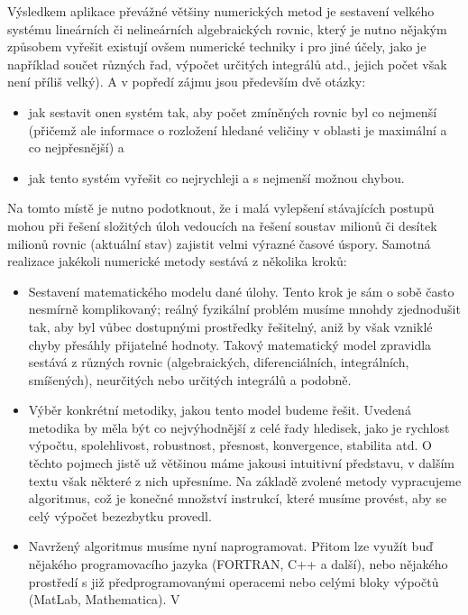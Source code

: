 {    Výsledkem aplikace převážné většiny numerických metod je sestavení velkého systému lineárních či
    nelineárních algebraických rovnic, který je nutno nějakým způsobem vyřešit existují ovšem
    numerické techniky i pro jiné účely, jako je například součet různých řad, výpočet určitých
    integrálů atd., jejich počet však není příliš velký). A v popředí zájmu jsou především dvě
    otázky:
    \begin{itemize}
      \item jak sestavit onen systém tak, aby počet zmíněných rovnic byl co nej\-men\-ší (přičemž 
            ale informace o rozložení hledané veličiny v oblasti je maximální a co nejpřesnější) a
      \item jak tento systém vyřešit co nejrychleji a s nejmenší možnou chybou.
    \end{itemize}
    Na tomto místě je nutno podotknout, že i malá vylepšení stávajících postupů mohou při řešení
    složitých úloh vedoucích na řešení soustav milionů či desítek milionů rovnic (aktuální stav)
    zajistit velmi výrazné časové úspory. Samotná realizace jakékoli numerické metody sestává z
    několika kroků:
    \begin{itemize}
      \item Sestavení matematického modelu dané úlohy. Tento krok je sám o sobě často nesmírně
            komplikovaný; reálný fyzikální problém musíme mnohdy zjednodušit tak, aby byl vůbec
            dostupnými prostředky řešitel\-ný, aniž by však vzniklé chyby přesáhly přijatelné 
            hodnoty. Takový matematický model zpravidla sestává z různých rovnic (algebraických,
            diferenciálních, integrálních, smíšených), neurčitých nebo určitých integrálů a podobně.
      \item Výběr konkrétní metodiky, jakou tento model budeme řešit. Uvedená me\-to\-di\-ka by měla
            být co nejvýhodnější z celé řady hledisek, jako je rychlost výpočtu, spolehlivost,
            robustnost, přesnost, konvergence, stabilita atd. O těchto pojmech jistě už většinou 
            máme jakousi intuitivní představu, v dalším textu však některé z nich upřesníme. Na 
            základě zvolené metody vypracujeme algoritmus, což je konečné množství instrukcí, které 
            musíme provést, aby se celý výpočet bezezbytku provedl.
      \item Navržený algoritmus musíme nyní naprogramovat. Přitom lze využít buď nějakého
            programovacího jazyka (FORTRAN, C++ a další), nebo nějakého prostředí s již
            předprogramovanými operacemi nebo celými bloky výpočtů (MatLab, Mathematica). V 

\end{itemize}}
